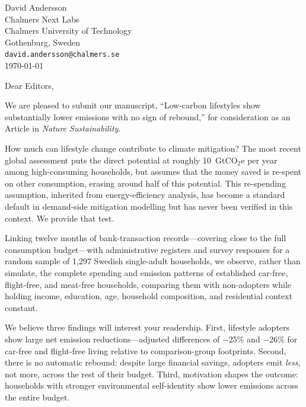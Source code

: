 \documentclass[12pt,a4paper]{article}
\begin{document}
\begin{flushright}
David Andersson\\
Chalmers Next Labs\\
Chalmers University of Technology\\
Gothenburg, Sweden\\[0.4em]
\texttt{david.andersson@chalmers.se}\\[1em]
\today
\end{flushright}

\bigskip

Dear Editors,

We are pleased to submit our manuscript, ``Low-carbon lifestyles show substantially lower emissions with no sign of rebound,'' for consideration as an Article in \textit{Nature Sustainability}.

How much can lifestyle change contribute to climate mitigation? The most recent global assessment puts the direct potential at roughly 10~GtCO$_2$e per year among high-consuming households, but assumes that the money saved is re-spent on other consumption, erasing around half of this potential. This re-spending assumption, inherited from energy-efficiency analysis, has become a standard default in demand-side mitigation modelling but has never been verified in this context. We provide that test.

Linking twelve months of bank-transaction records---covering
close to the full consumption budget---with administrative registers and survey responses for a random sample of 1,297 Swedish single-adult
households, we observe, rather than simulate, the complete spending and emission patterns of established car-free, flight-free, and meat-free households, comparing them with non-adopters while holding income, education, age, household composition, and residential context constant.

We believe three findings will interest your readership. First, lifestyle adopters show large net emission reductions---adjusted differences of $-$25\% and $-$26\% for car-free and flight-free living relative to comparison-group footprints. Second, there is no automatic rebound: despite large financial savings, adopters emit \textit{less}, not more, across the rest of their budget. Third, motivation shapes the outcome: households with stronger environmental self-identity show lower emissions across the entire budget. 
\end{document}

